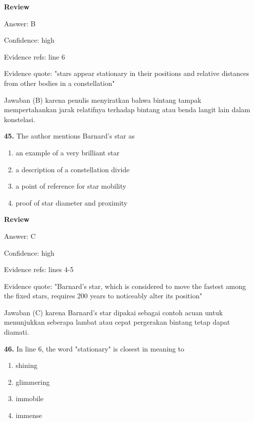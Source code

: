 \documentclass[12pt]{article}
\begin{document}
\begingroup
\setlength{\parskip}{0pt}
\setlength{\parindent}{0pt}
\textbf{Review}\par
Answer: B\par
Confidence: high\par
Evidence refs: line 6\par
Evidence quote: "stars appear stationary in their positions and relative distances from other bodies in a constellation"\par
Jawaban (B) karena penulis menyiratkan bahwa bintang tampak mempertahankan jarak relatifnya terhadap bintang atau benda langit lain dalam konstelasi.\par
\endgroup
\par
\vspace{0.25\baselineskip}
\noindent\textbf{45.} The author mentions Barnard's star as
\begin{enumerate}[label=(\Alph*),leftmargin=*,itemsep=0.2em]
\item an example of a very brilliant star
\item a description of a constellation divide
\item a point of reference for star mobility
\item proof of star diameter and proximity
\end{enumerate}
\par
\begingroup
\setlength{\parskip}{0pt}
\setlength{\parindent}{0pt}
\textbf{Review}\par
Answer: C\par
Confidence: high\par
Evidence refs: lines 4-5\par
Evidence quote: "Barnard's star, which is considered to move the fastest among the fixed stars, requires 200 years to noticeably alter its position"\par
Jawaban (C) karena Barnard's star dipakai sebagai contoh acuan untuk menunjukkan seberapa lambat atau cepat pergerakan bintang tetap dapat diamati.\par
\endgroup
\par
\vspace{0.25\baselineskip}
\noindent\textbf{46.} In line 6, the word "stationary" is closest in meaning to
\begin{enumerate}[label=(\Alph*),leftmargin=*,itemsep=0.2em]
\item shining
\item glimmering
\item immobile
\item immense
\end{enumerate}
\end{document}
